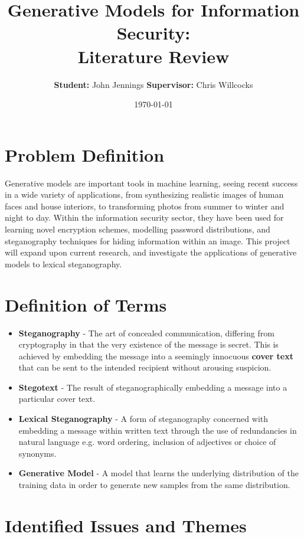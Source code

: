 \documentclass[11pt,a4paper]{article}
\title{Generative Models for Information Security: \\ Literature Review}
\author{{\bf Student:} John Jennings  \hspace{3mm} {\bf Supervisor:} Chris Willcocks}
\date{\today}
\begin{document}
 
\maketitle 

\section *{Problem Definition}
Generative models are important tools in machine learning, seeing recent success in a wide variety of applications, from synthesizing realistic images of human faces and house interiors, to transforming photos from summer to winter and night to day. Within the information security sector, they have been used for learning novel encryption schemes, modelling password distributions, and steganography techniques for hiding information within an image. This project will expand upon current research, and investigate the applications of generative models to lexical steganography.

\section *{Definition of Terms}
\begin{itemize}[leftmargin=0pt]
\item[] \textbf{Steganography} - The art of concealed communication, differing from cryptography in that the very existence of the message is secret. This is achieved by embedding the message into a seemingly innocuous \textbf{cover text} that can be sent to the intended recipient without arousing suspicion. 

\item[] \textbf{Stegotext} - The result of steganographically embedding a message into a particular cover text.

\item[] \textbf{Lexical Steganography} - A form of steganography concerned with embedding a message within written text through the use of redundancies in natural language e.g. word ordering, inclusion of adjectives or choice of synonyms.

\item[] \textbf{Generative Model} - A model that learns the underlying distribution of the training data in order to generate new samples from the same distribution.

\end{itemize}

\newpage

\section *{Identified Issues and Themes}
\end{document}
